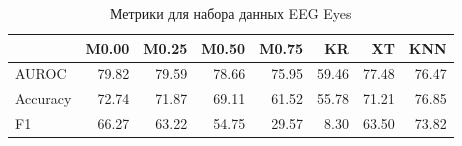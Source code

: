 \begin{table}
\caption{Метрики для набора данных EEG Eyes}
\label{tab:EEG Eyes}
\begin{tabular}{lrrrrrrr}
\toprule
 & M0.00 & M0.25 & M0.50 & M0.75 & KR & XT & KNN \\
\midrule
AUROC & 79.82 & 79.59 & 78.66 & 75.95 & 59.46 & 77.48 & 76.47 \\
Accuracy & 72.74 & 71.87 & 69.11 & 61.52 & 55.78 & 71.21 & 76.85 \\
F1 & 66.27 & 63.22 & 54.75 & 29.57 & 8.30 & 63.50 & 73.82 \\
\bottomrule
\end{tabular}
\end{table}
